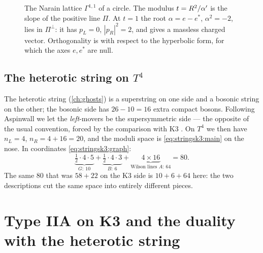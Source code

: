\begin{figure}[ht]
\centering
{}
\caption{The Narain lattice $\Gamma^{1,1}$ of a circle. The modulus $t=R^2/\alpha'$ is the slope
of the positive line $\Pi$. At $t=1$ the root $\alpha=e-e^*$, $\alpha^2=-2$, lies in $\Pi^\perp$:
it has $p_L=0$, $|p_R|^2=2$, and gives a massless charged vector. Orthogonality is with respect
to the hyperbolic form, for which the axes $e,e^*$ are null.}
\label{fig:stringsk3:circle}
\end{figure}

\subsection{The heterotic string on \texorpdfstring{$T^4$}{T4}}
The heterotic string (\cref{ch:ghosts}) is a superstring on one side and a bosonic string on
the other; the bosonic side has $26-10=16$ extra compact bosons. Following Aspinwall we let the
\emph{left}-movers be the supersymmetric side --- the opposite of the usual convention, forced
by the comparison with K3 . On $T^4$ we then have
$n_L=4$, $n_R=4+16=20$, and the moduli space is \eqref{eq:stringsk3:main} on the nose. In
coordinates \eqref{eq:stringsk3:graph}:
\begin{equation}\label{eq:stringsk3:hetcount}
  \underbrace{\tfrac12\cdot4\cdot5}_{G:\ 10}+\underbrace{\tfrac12\cdot4\cdot3}_{B:\ 6}
  +\underbrace{4\times16}_{\text{Wilson lines }A:\ 64}=80 .
\end{equation}
The same $80$ that was $58+22$ on the K3 side is $10+6+64$ here: the two descriptions
cut the same space into entirely different pieces.

\section{Type IIA on K3 and the duality with the heterotic string}\label{sec:stringsk3:duality}

